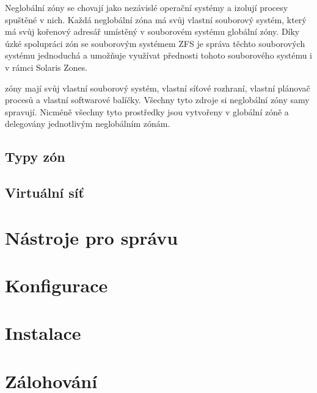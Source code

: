 Neglobální zóny se chovají jako nezávislé operační systémy a izolují procesy spuštěné v nich. Každá neglobální zóna má svůj
vlastní souborový systém, který má svůj kořenový adresář umístěný v souborovém systému globální zóny. Díky úzké spolupráci 
zón se souborovým systémem ZFS je správa těchto souborových systému jednoduchá a umožňuje využívat přednosti tohoto
souborového systému i v rámci Solaris Zones.

zóny mají svůj vlastní souborový systém, vlastní síťové rozhraní, vlastní plánovač procesů a vlastní softwarové
balíčky. Všechny
tyto zdroje si neglobální zóny samy spravují. Nicméně všechny tyto prostředky jsou vytvořeny v globální zóně a delegovány 
jednotlivým neglobálním zónám.


\subsection{Typy zón}
\label{chapter:zones:types}



\subsection{Virtuální síť}

\section{Nástroje pro správu}

\section{Konfigurace}

\section{Instalace}

\section{Zálohování}